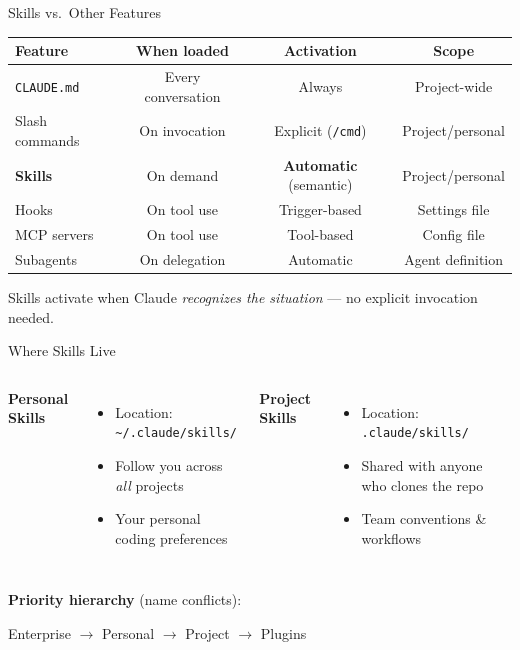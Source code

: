 \documentclass[aspectratio=169]{beamer}
\begin{document}
\begin{frame}{Skills vs.\ Other Features}
\begin{table}
\centering\small
\begin{tabular}{lccc}
\toprule
\textbf{Feature} & \textbf{When loaded} & \textbf{Activation} & \textbf{Scope} \\
\midrule
\texttt{CLAUDE.md} & Every conversation & Always & Project-wide \\
Slash commands & On invocation & Explicit (\texttt{/cmd}) & Project/personal \\
\textbf{Skills} & On demand & \textbf{Automatic} (semantic) & Project/personal \\
Hooks & On tool use & Trigger-based & Settings file \\
MCP servers & On tool use & Tool-based & Config file \\
Subagents & On delegation & Automatic & Agent definition \\
\bottomrule
\end{tabular}
\end{table}

\bigskip
Skills activate when Claude \emph{recognizes the situation} --- no explicit invocation needed.
\end{frame}

\begin{frame}{Where Skills Live}
\begin{columns}[T]
\textbf{\color{popblue}Personal Skills}
\begin{itemize}
  \item Location: \texttt{\textasciitilde/.claude/skills/}
  \item Follow you across \emph{all} projects
  \item Your personal coding preferences
\end{itemize}

\textbf{\color{paramgreen}Project Skills}
\begin{itemize}
  \item Location: \texttt{.claude/skills/}
  \item Shared with anyone who clones the repo
  \item Team conventions \& workflows
\end{itemize}
\end{columns}

\bigskip
\textbf{Priority hierarchy} (name conflicts):
\begin{center}
\large
Enterprise $\to$ Personal $\to$ Project $\to$ Plugins
\end{center}
\end{frame}
\end{document}
